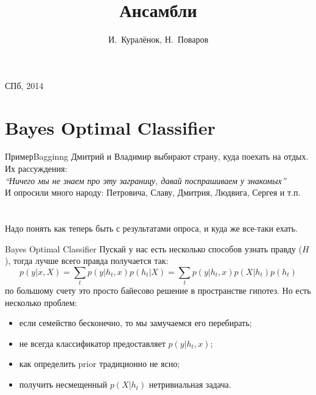 \documentclass[14pt, fleqn, xcolor={dvipsnames, table}]{beamer}
\title{Ансамбли\\\small{}}
\author[]{\small{%
И.~Куралёнок,
Н.~Поваров}}
\date{}
\begin{document}
\begin{frame}
\maketitle
\small
\begin{center}
\vspace{-60pt}
\vspace{80pt}
\footnotesize СПб, 2014
\end{center}
\end{frame}

\section{Bayes Optimal Classifier}
\begin{frame}{Пример}{Bagginng}
Дмитрий и Владимир выбирают страну, куда поехать на отдых. Их рассуждения: \\
\textit{``Ничего мы не знаем про эту заграницу, давай поспрашиваем у знакомых''} \\
И опросили много народу: Петровича, Славу, Дмитрия, Людвига, Сергея и т.п.\\
~\\
~\\
Надо понять как теперь быть с результатами опроса, и куда же все-таки ехать.
\end{frame}

\begin{frame}{Bayes Optimal Classifier}
Пускай у нас есть несколько способов узнать правду ($H$), тогда лучше всего правда получается так:
{\small
$$
p(y| x, X) = \sum_t p(y|h_t, x) p(h_t | X) = \sum_t p(y|h_t, x) p(X | h_t) p(h_t) 
$$
}
по большому счету это просто байесово решение в пространстве гипотез. Но есть несколько проблем:
\small
\begin{itemize}
  \item если семейство бесконечно, то мы замучаемся его перебирать;
  \item не всегда классификатор предоставляет $p(y|h_t, x)$;
  \item как определить prior традиционно не ясно;
  \item получить несмещенный $p(X|h_t)$ нетривиальная задача.
\end{itemize}
\end{frame}
\end{document}
